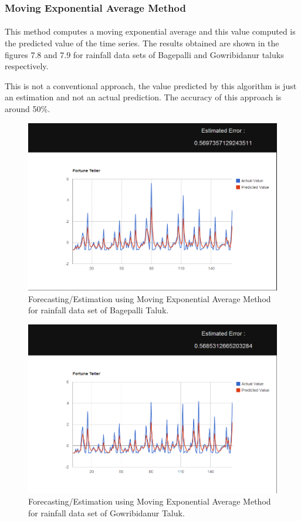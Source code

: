 \documentclass[12pt,a4paper]{report}
\begin{document}
\subsubsection{Moving Exponential Average Method}
\paragraph{} This method computes a moving exponential average and this value computed is the predicted value of the time series. The results obtained are shown in the figures 7.8 and 7.9 for rainfall data sets of Bagepalli and Gowribidanur taluks respectively.




This is not a conventional approach, the value predicted by this algorithm is just an estimation and not an actual prediction. The accuracy of this approach is around 50\%.
\begin{figure}[h!]
  \centering
    \includegraphics[scale=0.55]{./screenshots/result_fort_MEA_Bag.png}
  \caption{Forecasting/Estimation using Moving Exponential Average Method for rainfall data set of Bagepalli Taluk.}
\end{figure}


\begin{figure}[h!]
  \centering
    \includegraphics[scale=0.55]{./screenshots/result_fort_MEA_Gow.png}
  \caption{Forecasting/Estimation using Moving Exponential Average Method for rainfall data set of Gowribidanur Taluk.}
\end{figure}
\end{document}
